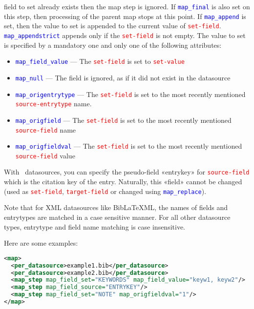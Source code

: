 \documentclass{ltxdockit}
\begin{document}
\begin{itemize}
  field to set already exists then the map step is ignored. If
  \textcolor{blue}{\texttt{map\_final}} is also set on this step, then
  processing of the parent map stops at this point. If
  \textcolor{blue}{\texttt{map\_append}} is set, then the value to set is
  appended to the current value of \textcolor{red}{\texttt{set-field}}.
  \textcolor{blue}{\texttt{map\_appendstrict}} appends only if the
  \textcolor{red}{\texttt{set-field}} is not empty. The value to set is
  specified by a mandatory one and only one of the following attributes:
  \begin{itemize}
    \item \textcolor{blue}{\texttt{map\_field\_value}} --- The
      \textcolor{red}{\texttt{set-field}} is set to
      \textcolor{red}{\texttt{set-value}}
    \item \textcolor{blue}{\texttt{map\_null}} --- The field is ignored, as
      if it did not exist in the datasource
    \item \textcolor{blue}{\texttt{map\_origentrytype}} --- The
      \textcolor{red}{\texttt{set-field}} is set to the
      most recently mentioned \textcolor{red}{\texttt{source-entrytype}} name.
    \item \textcolor{blue}{\texttt{map\_origfield}} --- The
      \textcolor{red}{\texttt{set-field}} is set to the most recently
      mentioned \textcolor{red}{\texttt{source-field}} name
    \item \textcolor{blue}{\texttt{map\_origfieldval}} --- The
      \textcolor{red}{\texttt{set-field}} is set to the most recently
      mentioned \textcolor{red}{\texttt{source-field}} value
  \end{itemize}
\end{itemize}

\noindent With \bibtex\ datasources, you can specify the
pseudo-field «entrykey» for \textcolor{red}{\texttt{source-field}}
which is the citation key of the entry. Naturally, this «field» cannot
be changed (used as \textcolor{red}{\texttt{set-field}},
\textcolor{red}{\texttt{target-field}} or changed using
\textcolor{blue}{\texttt{map\_replace}}).

Note that for XML datasources like BibLaTeXML, the names of
fields and entrytypes are matched in a case sensitive manner. For all other
datasource types, entrytype and field name matching is
case insensitive.

\noindent Here are some examples:

\begin{lstlisting}[language=xml,escapechar=+,mathescape=true]
<map>
  <per_datasource>example1.bib</per_datasource>
  <per_datasource>example2.bib</per_datasource>
  <map_step map_field_set="KEYWORDS" map_field_value="keyw1, keyw2"/>
  <map_step map_field_source="ENTRYKEY"/>
  <map_step map_field_set="NOTE" map_origfieldval="1"/>
</map>
\end{lstlisting}
\end{document}
